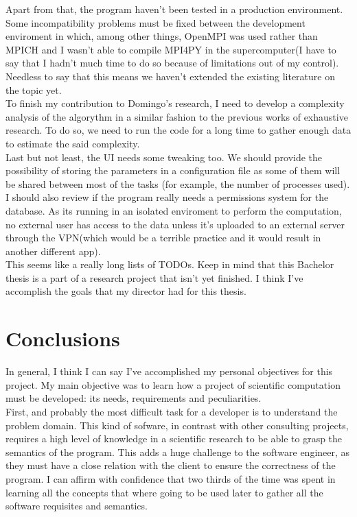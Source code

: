 \documentclass{tfg_domingo}
\begin{document}
  Apart from that, the program haven't been tested in a production environment.
  Some incompatibility problems must be fixed between the development
  enviroment in which, among other things, OpenMPI was used rather than
  MPICH and I wasn't able to compile MPI4PY in the supercomputer(I have to
  say that I hadn't much time to do so because of limitations out of
  my control). Needless to say that this means we haven't extended the
  existing literature on the topic yet.\\

  To finish my contribution to Domingo's research, I need to develop a
  complexity analysis of the algorythm in a similar fashion to the previous
  works of exhaustive research. To do so, we need to run the code for a long
  time to gather enough data to estimate the said complexity.\\

  Last but not least, the UI needs some tweaking too. We should provide the
  possibility of storing the parameters in a configuration file as some of
  them will be shared between most of the tasks (for example, the number of
  processes used). I should also review if the program really needs a
  permissions system for the database. As its running in an isolated
  enviroment to perform the computation, no external user has access to the
  data unless it's uploaded to an external server through the VPN(which would
  be a terrible practice and it would result in another different app).\\

  This seems like a really long lists of TODOs. Keep in mind that this
  Bachelor thesis is a part of a research project that isn't yet finished. I
  think I've accomplish the goals that my director had for this thesis.

\chapter{Conclusions}

  In general, I think I can say I've accomplished my personal objectives for
  this project. My main objective was to learn how a project of scientific
  computation must be developed: its needs, requirements and peculiarities.\\

  First, and probably the most difficult task for a developer is to understand
  the problem domain. This kind of sofware, in contrast with other consulting
  projects, requires a high level of knowledge in a scientific research to be
  able to grasp the semantics of the program. This adds a huge challenge to
  the software engineer, as they must have a close relation with the client to
  ensure the correctness of the program. I can affirm with confidence that
  two thirds of the time was spent in learning all the concepts that where
  going to be used later to gather all the software requisites and semantics.\\
\end{document}
